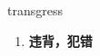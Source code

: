 
\begin{frame}
{\huge transgress}
\begin{center}
\begin{enumerate}\Large
  \item \textbf{违背，犯错}
\end{enumerate}
\end{center}
\end{frame}
